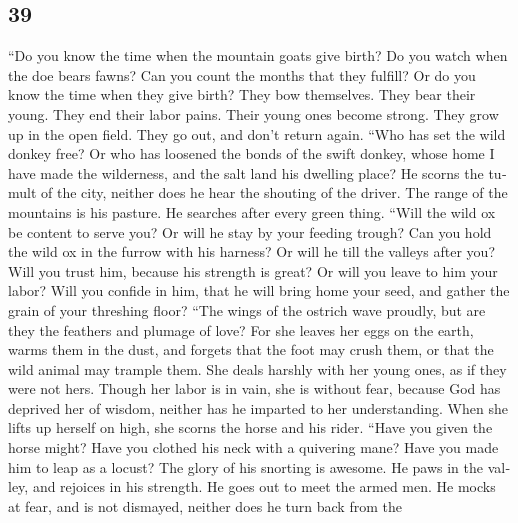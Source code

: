 \begin{paracol}{2}
\switchcolumn
\begin{otherlanguage}{english}

\hypertarget{section-77}{%
\section{39}\label{section-77}}

 ``Do you know the time when the mountain goats give
birth? Do you watch when the doe bears fawns?  Can you
count the months that they fulfill? Or do you know the time when they
give birth?  They bow themselves. They bear their young.
They end their labor pains.  Their young ones become
strong. They grow up in the open field. They go out, and don't return
again.  ``Who has set the wild donkey free? Or who has
loosened the bonds of the swift donkey,  whose home I have
made the wilderness, and the salt land his dwelling place?
 He scorns the tumult of the city, neither does he hear
the shouting of the driver.  The range of the mountains is
his pasture. He searches after every green thing.  ``Will
the wild ox be content to serve you? Or will he stay by your feeding
trough?  Can you hold the wild ox in the furrow with his
harness? Or will he till the valleys after you?  Will you
trust him, because his strength is great? Or will you leave to him your
labor?  Will you confide in him, that he will bring home
your seed, and gather the grain of your threshing floor? 
``The wings of the ostrich wave proudly, but are they the feathers and
plumage of love?  For she leaves her eggs on the earth,
warms them in the dust,  and forgets that the foot may
crush them, or that the wild animal may trample them. 
She deals harshly with her young ones, as if they were not hers. Though
her labor is in vain, she is without fear,  because God
has deprived her of wisdom, neither has he imparted to her
understanding.  When she lifts up herself on high, she
scorns the horse and his rider.  ``Have you given the
horse might? Have you clothed his neck with a quivering mane?
 Have you made him to leap as a locust? The glory of his
snorting is awesome.  He paws in the valley, and rejoices
in his strength. He goes out to meet the armed men.  He
mocks at fear, and is not dismayed, neither does he turn back from the

\end{otherlanguage}
\end{paracol}
